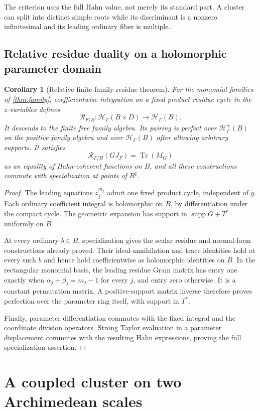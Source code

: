 \documentclass[11pt,letterpaper]{article}
\newtheorem{corollary}[theorem]{Corollary}
\theoremstyle{definition}
\theoremstyle{remark}
\newcommand{\HH}{\mathcal H}
\newcommand{\supp}{\operatorname{supp}}
\newcommand{\Tr}{\operatorname{Tr}}
\newcommand{\sh}{^{\sharp}}
\newcommand{\Hp}{\HH^{+}_{\Gamma}}
\newcommand{\Hh}{\HH_{\Gamma}}
\newcommand{\RR}{\mathcal R}
\begin{document}
The criterion uses the full Hahn value, not merely its standard part. A cluster can split into distinct simple roots while its discriminant is a nonzero infinitesimal and its leading ordinary fiber is multiple.

\subsection{Relative residue duality on a holomorphic parameter domain}
\begin{corollary}[Relative finite-family residue theorem]\label{cor:relative}
For the monomial families of \cref{thm:family}, coefficientwise integration on a fixed product residue cycle in the $z$-variables defines
\[
 \RR_{F/B}:\Hh(B\times D)\longrightarrow\Hh(B).
\]
It descends to the finite free family algebra. Its pairing is perfect over $\Hp(B)$ on the positive family algebra and over $\Hh(B)$ after allowing arbitrary supports. It satisfies
\[
 \RR_{F/B}(GJ_F)=\Tr(M_G)
\]
as an equality of Hahn-coherent functions on $B$, and all these constructions commute with specialization at points of $B\sh$.
\end{corollary}
\begin{proof}
The leading equations $z_j^{m_j}$ admit one fixed product cycle, independent of $y$. Each ordinary coefficient integral is holomorphic on $B$, by differentiation under the compact cycle. The geometric expansion has support in $\supp G+T^*$ uniformly on $B$.

At every ordinary $b\in B$, specialization gives the scalar residue and normal-form constructions already proved. Their ideal-annihilation and trace identities hold at every such $b$ and hence hold coefficientwise as holomorphic identities on $B$. In the rectangular monomial basis, the leading residue Gram matrix has entry one exactly when $\alpha_j+\beta_j=m_j-1$ for every $j$, and entry zero otherwise. It is a constant permutation matrix. A positive-support matrix inverse therefore proves perfection over the parameter ring itself, with support in $T^*$.

Finally, parameter differentiation commutes with the fixed integral and the coordinate division operators. Strong Taylor evaluation in a parameter displacement commutes with the resulting Hahn expressions, proving the full specialization assertion.
\end{proof}

\section{A coupled cluster on two Archimedean scales}
\label{sec:examplefour}
\end{document}
